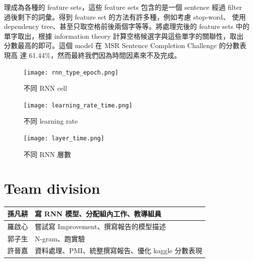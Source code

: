 \documentclass[12pt, a4paper]{article}
\theoremstyle{mystyle}	%
\begin{document}
\begin{enumerate}
    理成為各種的 feature sets，這些 feature sets 包含的是一個 sentence 經過 
    filter 過後剩下的詞彙。得到 feature set 的方法有許多種，例如考慮 stop-word、
    使用 dependency tree、甚至只取空格前後兩個字等等。將處理完後的 feature sets 
    中的單字取出，根據 information theory 計算空格候選字與這些單字的關聯性，取出
    分數最高的即可。這個 model 在 MSR Sentence Completion Challenge 的分數表現高
    達 61.44\%，然而最終我們因為時間因素來不及完成。
    \begin{figure}[!htb]
      \centering
      \texttt{[image: rnn\_type\_epoch.png]}
      \caption{不同 RNN cell}
      \label{fig:rnnType}
     \endminipage\hfill
      \texttt{[image: learning\_rate\_time.png]}
      \caption{不同 learning rate}
      \label{fig:learningRate}
     \endminipage\hfill
      \texttt{[image: layer\_time.png]}
      \caption{不同 RNN 層數}
      \label{fig:layerTime}
     \endminipage
    \end{figure}
\end{enumerate}

\section{Team division}
\begin{table}[h]
\centering
\begin{tabular}{ |C{2cm}|C{10cm}| }
  \hline
  孫凡耕 & 寫 RNN 模型、分配組內工作、教導組員\\
  \hline
  羅啟心 & 嘗試寫 Improvement、撰寫報告的模型描述\\
  \hline
  郭子生 & N-gram、跑實驗\\
  \hline
  許晉嘉 & 資料處理、PMI、統整撰寫報告、優化 kaggle 分數表現\\
  \hline
\end{tabular}
\end{table}
\end{document}
